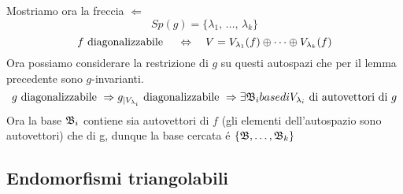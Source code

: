 \begin{prop}
Mostriamo ora la freccia $\Leftarrow$
$$Sp(g)=\{ \lambda_1, \, \dots , \, \lambda_k \}$$ 
$$ f \text{ diagonalizzabile } \quad \Leftrightarrow \quad V = V_{\lambda_1 } (f) \oplus \dots \oplus V_{\lambda_k} (f) $$
Ora possiamo considerare la restrizione di $g$ su questi autospazi che per il lemma precedente sono $g$-invarianti.\\
$$ g\text{ diagonalizzabile } \Rightarrow g_{\vert V_{\lambda_i}} \text{ diagonalizzabile } \Rightarrow \exists \mathfrak{B}_i {base di } V_{\lambda_i} \text{ di autovettori di } g $$
Ora la base $\mathfrak{B}_i$ contiene sia autovettori di $f$ (gli elementi dell'autospazio sono autovettori) che di g, dunque la base cercata \'e $\{ \mathfrak{B} , \dots , \mathfrak{B}_k \} $
\endproof
\end{prop}
\spazio
\newpage

\subsection{Endomorfismi triangolabili }

